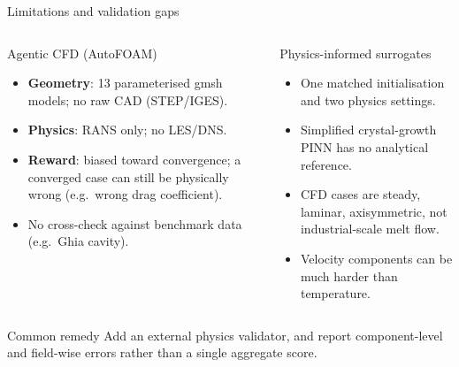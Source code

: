 \documentclass[aspectratio=169,10pt]{beamer}
\begin{document}
\begin{frame}{Limitations and validation gaps}
\begin{columns}[T,onlytextwidth]
\begin{alertblock}{Agentic CFD (AutoFOAM)}
\begin{itemize}\small
  \item \textbf{Geometry}: 13 parameterised gmsh models; no raw CAD (STEP/IGES).
  \item \textbf{Physics}: RANS only; no LES/DNS.
  \item \textbf{Reward}: biased toward convergence; a converged case can still be physically wrong (e.g.\ wrong drag coefficient).
  \item No cross-check against benchmark data (e.g.\ Ghia cavity).
\end{itemize}
\end{alertblock}
\begin{alertblock}{Physics-informed surrogates}
\begin{itemize}\small
  \item One matched initialisation and two physics settings.
  \item Simplified crystal-growth PINN has no analytical reference.
  \item CFD cases are steady, laminar, axisymmetric, not industrial-scale melt flow.
  \item Velocity components can be much harder than temperature.
\end{itemize}
\end{alertblock}
\end{columns}
\vspace{0.2cm}
\begin{exampleblock}{Common remedy}
\small Add an external physics validator, and report component-level and field-wise errors rather than a single aggregate score.
\end{exampleblock}
\end{frame}
\end{document}
